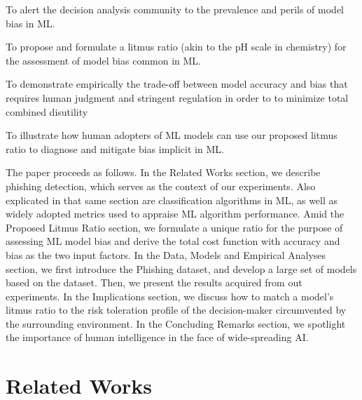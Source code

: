 \documentclass[deca,blindrev]{informs3} %
\begin{document}
\begin{henumerate}
\item To alert the decision analysis  community to the prevalence and perils of model bias in ML.

\item To propose and formulate a litmus ratio (akin to the pH scale in chemistry) for the assessment of model bias common in ML.
\item To demonstrate empirically the trade-off between model accuracy and bias that  requires human judgment and stringent regulation in order to to minimize total combined  disutility
\item To illustrate  how human adopters of ML models can use our proposed litmus ratio to diagnose and mitigate bias implicit in ML.
 
\end{henumerate}

The paper proceeds as follows. In the Related Works section, we describe phishing detection, which serves as the context of our experiments. Also explicated in that same section are classification algorithms in ML, as well as widely adopted metrics used to appraise ML algorithm performance. Amid the Proposed Litmus Ratio section, we formulate a unique ratio for the purpose of assessing ML model bias and derive the total cost function with accuracy and bias as the two input factors. In the Data, Models  and Empirical Analyses section, we first introduce the Phishing dataset, and develop a large set of models based on the dataset.  Then, we present the results acquired from out experiments. In the Implications section, we discuss how to match a model's litmus ratio to the risk toleration profile of the decision-maker circumvented by the surrounding environment. In the Concluding Remarks section, we spotlight the importance of human intelligence in the face of wide-spreading AI. 


\section{Related Works }
\end{document}
